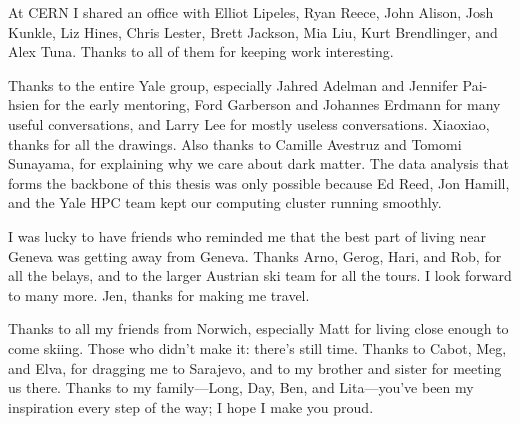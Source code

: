 At CERN I shared an office with Elliot Lipeles, Ryan Reece, John Alison, Josh Kunkle, Liz Hines, Chris Lester, Brett Jackson, Mia Liu, Kurt Brendlinger, and Alex Tuna. Thanks to all of them for keeping work interesting.

Thanks to the entire Yale group, especially Jahred Adelman and Jennifer Pai-hsien for the early mentoring, Ford Garberson and Johannes Erdmann for many useful conversations, and Larry Lee for mostly useless conversations. Xiaoxiao, thanks for all the drawings.
Also thanks to Camille Avestruz and Tomomi Sunayama, for explaining why we care about dark matter.
The data analysis that forms the backbone of this thesis was only possible because Ed Reed, Jon Hamill, and the Yale HPC team kept our computing cluster running smoothly.


I was lucky to have friends who reminded me that the best part of living near Geneva was getting away from Geneva.
Thanks Arno, Gerog, Hari, and Rob, for all the belays, and to the larger Austrian ski team for all the tours. I look forward to many more.
Jen, thanks for making me travel.

Thanks to all my friends from Norwich, especially Matt for living close enough to come skiing.
Those who didn't make it: there's still time.
Thanks to Cabot, Meg, and Elva, for dragging me to Sarajevo, and to my brother and sister for meeting us there.
Thanks to my family---Long, Day, Ben, and Lita---you've been my inspiration every step of the way; I hope I make you proud.

